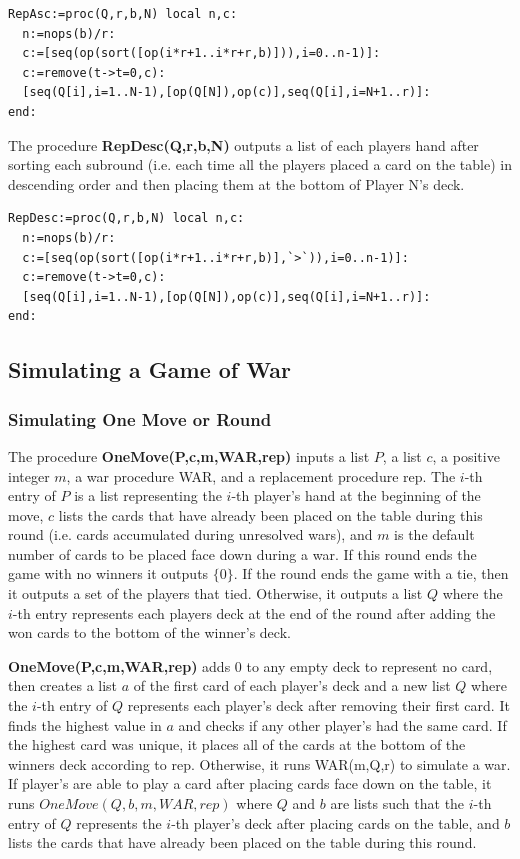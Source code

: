 \documentclass[12pt]{amsart}
\begin{document}
\begin{lstlisting}
RepAsc:=proc(Q,r,b,N) local n,c:
  n:=nops(b)/r:
  c:=[seq(op(sort([op(i*r+1..i*r+r,b)])),i=0..n-1)]:
  c:=remove(t->t=0,c):
  [seq(Q[i],i=1..N-1),[op(Q[N]),op(c)],seq(Q[i],i=N+1..r)]:
end:
\end{lstlisting}


The procedure \textbf{RepDesc(Q,r,b,N)} outputs a list of each players hand after sorting each subround (i.e. each time all the players placed a card on the table) in descending order and then placing them at the bottom of Player N's deck.




\begin{lstlisting}
RepDesc:=proc(Q,r,b,N) local n,c:
  n:=nops(b)/r:
  c:=[seq(op(sort([op(i*r+1..i*r+r,b)],`>`)),i=0..n-1)]:
  c:=remove(t->t=0,c):
  [seq(Q[i],i=1..N-1),[op(Q[N]),op(c)],seq(Q[i],i=N+1..r)]:
end:
\end{lstlisting}




\subsection{Simulating a Game of War}


\subsubsection{Simulating One Move or Round}\hfill


The procedure \textbf{OneMove(P,c,m,WAR,rep)} inputs a list $P$, a list $c$, a positive integer $m$, a war procedure WAR, and a replacement procedure rep. The $i$-th entry of $P$ is a list representing the $i$-th player's hand at the beginning of the move, $c$ lists the cards that have already been placed on the table during this round (i.e. cards accumulated during unresolved wars), and $m$ is the default number of cards to be placed face down during a war. If this round ends the game with no winners it outputs $\{0\}$. If the round ends the game with a tie, then it outputs a set of the players that tied. Otherwise, it outputs a list $Q$ where the $i$-th entry represents each players deck at the end of the round after adding the won cards to the bottom of the winner's deck.


\textbf{OneMove(P,c,m,WAR,rep)} adds $0$ to any empty deck to represent no card, then creates a list $a$ of the first card of each player's deck and a new list $Q$ where the $i$-th entry of $Q$ represents each player's deck after removing their first card. It finds the highest value in $a$ and checks if any other player's had the same card. If the highest card was unique, it places all of the cards at the bottom of the winners deck according to rep. Otherwise, it runs WAR(m,Q,r) to simulate a war. If player's are able to play a card after placing cards face down on the table, it runs $OneMove(Q,b,m,WAR,rep)$ where $Q$ and $b$ are lists such that the $i$-th entry of $Q$ represents the $i$-th player's deck after placing cards on the table, and $b$ lists the cards that have already been placed on the table during this round.
\end{document}
